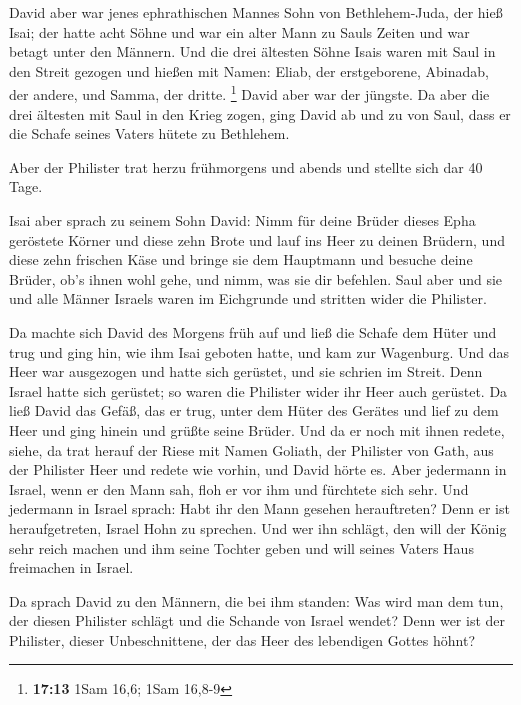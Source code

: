  David aber war jenes ephrathischen Mannes Sohn von
Bethlehem-Juda, der hieß Isai; der hatte acht Söhne und war ein alter
Mann zu Sauls Zeiten und war betagt unter den Männern. 
Und die drei ältesten Söhne Isais waren mit Saul in den Streit gezogen
und hießen mit Namen: Eliab, der erstgeborene, Abinadab, der andere, und
Samma, der dritte. \footnote{\textbf{17:13} 1Sam 16,6; 1Sam 16,8-9}
 David aber war der jüngste. Da aber die drei ältesten
mit Saul in den Krieg zogen,  ging David ab und zu von
Saul, dass er die Schafe seines Vaters hütete zu Bethlehem.

 Aber der Philister trat herzu frühmorgens und abends und
stellte sich dar 40 Tage.

 Isai aber sprach zu seinem Sohn David: Nimm für deine
Brüder dieses Epha geröstete Körner und diese zehn Brote und lauf ins
Heer zu deinen Brüdern,  und diese zehn frischen Käse und
bringe sie dem Hauptmann und besuche deine Brüder, ob's ihnen wohl gehe,
und nimm, was sie dir befehlen.  Saul aber und sie und
alle Männer Israels waren im Eichgrunde und stritten wider die
Philister.

 Da machte sich David des Morgens früh auf und ließ die
Schafe dem Hüter und trug und ging hin, wie ihm Isai geboten hatte, und
kam zur Wagenburg. Und das Heer war ausgezogen und hatte sich gerüstet,
und sie schrien im Streit.  Denn Israel hatte sich
gerüstet; so waren die Philister wider ihr Heer auch gerüstet.
 Da ließ David das Gefäß, das er trug, unter dem Hüter
des Gerätes und lief zu dem Heer und ging hinein und grüßte seine
Brüder.  Und da er noch mit ihnen redete, siehe, da trat
herauf der Riese mit Namen Goliath, der Philister von Gath, aus der
Philister Heer und redete wie vorhin, und David hörte es.
 Aber jedermann in Israel, wenn er den Mann sah, floh er
vor ihm und fürchtete sich sehr.  Und jedermann in Israel
sprach: Habt ihr den Mann gesehen herauftreten? Denn er ist
heraufgetreten, Israel Hohn zu sprechen. Und wer ihn schlägt, den will
der König sehr reich machen und ihm seine Tochter geben und will seines
Vaters Haus freimachen in Israel.

 Da sprach David zu den Männern, die bei ihm standen: Was
wird man dem tun, der diesen Philister schlägt und die Schande von
Israel wendet? Denn wer ist der Philister, dieser Unbeschnittene, der
das Heer des lebendigen Gottes höhnt?

